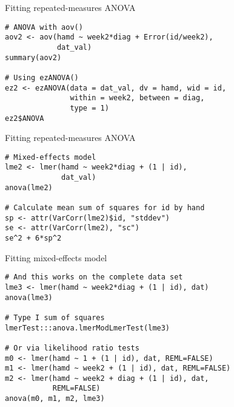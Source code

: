 \documentclass{beamer}
\begin{document}
{

\begin{frame}[fragile]{Fitting repeated-measures ANOVA}
  \begin{lstlisting}
# ANOVA with aov()
aov2 <- aov(hamd ~ week2*diag + Error(id/week2),
            dat_val)
summary(aov2)

# Using ezANOVA()
ez2 <- ezANOVA(data = dat_val, dv = hamd, wid = id,
               within = week2, between = diag,
               type = 1)
ez2$ANOVA
  \end{lstlisting}
\end{frame}

\begin{frame}[fragile]{Fitting repeated-measures ANOVA}
  \begin{lstlisting}
# Mixed-effects model
lme2 <- lmer(hamd ~ week2*diag + (1 | id),
             dat_val)
anova(lme2)

# Calculate mean sum of squares for id by hand
sp <- attr(VarCorr(lme2)$id, "stddev")
se <- attr(VarCorr(lme2), "sc")
se^2 + 6*sp^2
  \end{lstlisting}
\end{frame}

\begin{frame}[fragile]{Fitting mixed-effects model}
  \begin{lstlisting}
# And this works on the complete data set
lme3 <- lmer(hamd ~ week2*diag + (1 | id), dat)
anova(lme3)

# Type I sum of squares
lmerTest:::anova.lmerModLmerTest(lme3)

# Or via likelihood ratio tests
m0 <- lmer(hamd ~ 1 + (1 | id), dat, REML=FALSE)
m1 <- lmer(hamd ~ week2 + (1 | id), dat, REML=FALSE)
m2 <- lmer(hamd ~ week2 + diag + (1 | id), dat,
           REML=FALSE)
anova(m0, m1, m2, lme3)
  \end{lstlisting}
\end{frame}

}
\end{document}
